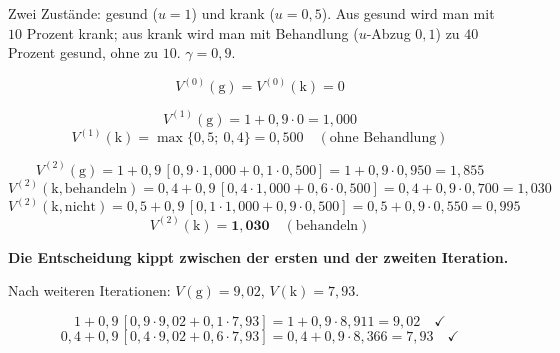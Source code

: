 \begin{aufgabe}
Zwei Zustände: gesund ($u = 1$) und krank ($u = 0{,}5$). Aus gesund wird man mit $10$ Prozent krank; aus krank wird man mit Behandlung ($u$-Abzug $0{,}1$) zu $40$ Prozent gesund, ohne zu $10$. $\gamma = 0{,}9$.

\loesung
{}
\[ V^{(0)}(\text{g}) = V^{(0)}(\text{k}) = 0 \]

\[ V^{(1)}(\text{g}) = 1 + 0{,}9\cdot0 = 1{,}000 \]
\[ V^{(1)}(\text{k}) = \max\{0{,}5;\ 0{,}4\} = 0{,}500 \quad (\text{ohne Behandlung}) \]

\[ V^{(2)}(\text{g}) = 1 + 0{,}9\,[0{,}9\cdot1{,}000 + 0{,}1\cdot0{,}500] = 1 + 0{,}9\cdot0{,}950 = 1{,}855 \]
\[ V^{(2)}(\text{k}, \text{behandeln}) = 0{,}4 + 0{,}9\,[0{,}4\cdot1{,}000+0{,}6\cdot0{,}500] = 0{,}4+0{,}9\cdot0{,}700 = 1{,}030 \]
\[ V^{(2)}(\text{k}, \text{nicht}) = 0{,}5 + 0{,}9\,[0{,}1\cdot1{,}000+0{,}9\cdot0{,}500] = 0{,}5+0{,}9\cdot0{,}550 = 0{,}995 \]
\[ V^{(2)}(\text{k}) = \mathbf{1{,}030} \quad (\text{behandeln}) \]

\begin{center}
\begin{minipage}{0.9\textwidth}
\textbf{Die Entscheidung kippt zwischen der ersten und der zweiten Iteration.}
\end{minipage}
\end{center}

\begin{center}
\begin{minipage}{0.88\textwidth}
\end{minipage}
\end{center}

Nach weiteren Iterationen: $V(\text{g}) = 9{,}02$, $V(\text{k}) = 7{,}93$.

\[ 1 + 0{,}9\,[0{,}9\cdot9{,}02 + 0{,}1\cdot7{,}93] = 1 + 0{,}9\cdot8{,}911 = 9{,}02 \quad \checkmark \]
\[ 0{,}4 + 0{,}9\,[0{,}4\cdot9{,}02 + 0{,}6\cdot7{,}93] = 0{,}4 + 0{,}9\cdot8{,}366 = 7{,}93 \quad \checkmark \]
\end{aufgabe}

